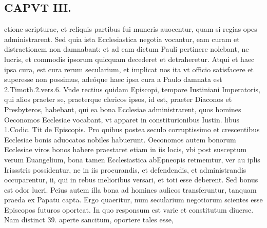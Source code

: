 \documentclass{article}
\begin{document}
\begin{pages}
\section*{CAPVT  III. }
\marginpar{[ p.151 ]}\pstart ctione scripturae, et reliquis partibus fui muneris auocentur, quam si regias opes administrarent. Sed quia ista Ecclesiastica negotia vocantur, eam curam et distractionem non damnabant: et ad eam dictum Pauli pertinere nolebant, ne lucris, et commodis ipsorum quicquam decederet et detraheretur. Atqui et haec ipsa cura, est cura rerum secularium, et implicat nos ita vt officio satisfacere et superesse non possimus, adeóque  haec ipsa cura a Paulo damnata est 2.Timoth.2.vers.6. Vnde rectius quidam Episcopi, tempore Iustiniani Imperatoris, qui alios praeter se, praeterque clericos ipsos, id est, praeter Diaconos et Presbyteros, habebant, qui ea bona Ecclesiae administrarent, quos homines Oeconomos Ecclesiae vocabant, vt apparet in constiturionibus Iustin. libus 1.Codic. Tit de Episcopis. Pro quibus postea seculo corruptissimo et crescentibus Ecclesiae bonis aduocatos nobiles habuerunt. Oeconomos autem bonorum Ecclesiae viros bonos habere praestaret etiam in iis locis, vbi post susceptum verum Euangelium, bona tamen Ecclesiastica abEpneopis retmemtur, ver au iplis Irissstris possidentur, ne in iis procurandis, et defendendis, et administrandis occuparentur, ii, qui in rebus melioribus versari, et toti esse deberent. Sed bonus est odor lucri. Peius autem illa bona ad homines aulicos transferuntur, tanquam praeda ex Papatu capta.  \pend\pstart Ergo quaeritur, num secularium negotiorum scientes esse Episcopos futuros oporteat. In quo responsum est varie et constitutum diuerse. Nam distinct 39. aperte sancitum, oportere tales esse,  \pend

\end{pages}
\end{document}
